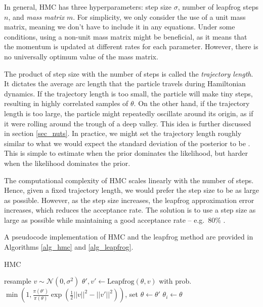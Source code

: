 \documentclass[12pt]{article}
\begin{document}
In general, HMC has three hyperparameters: step size $\sigma$, number of leapfrog steps $n$, and \textit{mass matrix} $m$. For simplicity, we only consider the use of a unit mass matrix, meaning we don't have to include it in any equations. Under some conditions, using a non-unit mass matrix might be beneficial, as it means that the momentum is updated at different rates for each parameter. However, there is no universally optimum value of the mass matrix.

The product of step size with the number of steps is called the \textit{trajectory length}. It dictates the average arc length that the particle travels during Hamiltonian dynamics. If the trajectory length is too small, the particle will make tiny steps, resulting in highly correlated samples of $\theta$. On the other hand, if the trajectory length is too large, the particle might repeatedly oscillate around its origin, as if it were rolling around the trough of a deep valley. This idea is further discussed in section \ref{sec_nuts}. In practice, we might set the trajectory length roughly similar to what we would expect the standard deviation of the posterior to be \cite{bnn_posterior}. This is simple to estimate when the prior dominates the likelihood, but harder when the likelihood dominates the prior.

The computational complexity of HMC scales linearly with the number of steps. Hence, given a fixed trajectory length, we would prefer the step size to be as large as possible. However, as the step size increases, the leapfrog approximation error increases, which reduces the acceptance rate. The solution is to use a step size as large as possible while maintaining a good acceptance rate -- e.g.\ $80\%$ \cite{bnn_posterior}.


A pseudocode implementation of HMC and the leapfrog method are provided in Algorithms \ref{alg_hmc} and \ref{alg_leapfrog}.

\begin{algorithm}
\caption{HMC}
\label{alg_hmc}
\begin{algorithmic}
 
	\State resample $v \sim \mathcal{N}(0, \sigma^2)$ 
	\State $\theta', v' \gets \textrm{Leapfrog}(\theta, v)$ 
	\State with prob. $\min{\left(1, \frac{\pi(\theta')}{\pi(\theta)} \exp \left( \frac{1}{2}||v||^2 - ||v'||^2 \right) \right)}$, set $\theta \gets \theta'$ 
	\State $\theta_i \gets \theta$ 
\EndFor
\end{algorithmic}
\end{algorithm}
\end{document}

